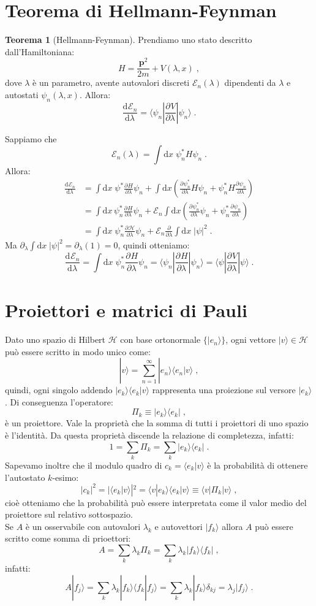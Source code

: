 \documentclass[12pt,a4paper]{report}
\theoremstyle{definition}
\newtheorem{thm}{Teorema}[section]
\newcommand{\pdev}[3][]{\frac{\partial^{#1} #2}{\partial #3^{#1}}}
\newcommand{\dev}[3][]{\frac{\mathrm{d}^{#1} #2}{\mathrm{d} #3^{#1}}}
\newcommand{\ham}{\mathcal{H}}
\numberwithin{equation}{section}
\newcommand{\diff}[1][]{\mathrm{d}#1}
\newcommand{\bra}{\langle}
\newcommand{\ket}{\rangle}
\begin{document}
\section{Teorema di Hellmann-Feynman}
\begin{thm}[Hellmann-Feynman] Prendiamo uno stato descritto dall'Hamiltoniana:
$$
H=\frac{\mathbf{p}^2}{2m}+V(\lambda,x)\;,
$$
dove $\lambda$ è un parametro, avente autovalori discreti $\mathcal{E}_n(\lambda)$ dipendenti da $\lambda$ e autostati $\psi_n(\lambda,x)$. Allora:
$$
\dev{\mathcal{E}_n}{\lambda}=\bra\psi_n|\pdev{V}{\lambda}|\psi_n\ket\;.
$$
\end{thm}
\proof
Sappiamo che
$$
\mathcal{E}_n(\lambda)=\int\diff{x}\;\psi_n^*H\psi_n\;.
$$
Allora:
\begin{align*}
\dev{\mathcal{E}_n}{\lambda}&= \int\diff{x}\;\psi^*\pdev{H}{\lambda}\psi_n+\int\diff{x}\left(\pdev{\psi_n^*}{\lambda}H\psi_n+\psi_n^*H\pdev{\psi_n}{\lambda}\right) \\
&= \int\diff{x}\,\psi_n^*\pdev{H}{\lambda}\psi_n+\mathcal{E}_n\int\diff{x}\left(\pdev{\psi_n^*}{\lambda}\psi_n+
\psi_n^*\pdev{\psi_n}{\lambda}\right) \\
&=\int\diff{x}\;\psi_n^*\pdev{\ham}{\lambda}\psi_n+\mathcal{E}_n\frac{\partial}{\partial\lambda}\int\diff{x}\;
|\psi|^2\;.
\end{align*}
Ma $\partial_{\lambda}\int\diff{x}\;|\psi|^2=\partial_{\lambda}(1)=0$, quindi otteniamo:
$$
\dev{\mathcal{E}_n}{\lambda}=\int\diff{x}\;\psi_n^*\pdev{H}{\lambda}\psi_n=\bra\psi_n|\pdev{H}{\lambda}|\psi_n\ket=\bra\psi|\pdev{V}{\lambda}|\psi\ket\;.
$$
\endproof
\section{Proiettori e matrici di Pauli}
Dato uno spazio di Hilbert $\ham$ con base ortonormale $\{|e_n\ket\}$, ogni vettore $|v\ket\in \ham$ può essere scritto in modo unico come:
$$
|v\ket=\sum_{n=1}^{\infty} |e_n\ket\bra e_n|v\ket\;,
$$
quindi, ogni singolo addendo $|e_k\ket\bra e_k|v\ket$ rappresenta una proiezione sul versore $|e_k\ket$. Di conseguenza l'operatore:
\begin{equation}
\Pi_k\equiv |e_k\ket\bra e_k|\;,
\end{equation}
è un proiettore. Vale la proprietà che la somma di tutti i proiettori di uno spazio è l'identità. Da questa proprietà discende la relazione di completezza, infatti:
$$
1=\sum_k \Pi_k=\sum_k |e_k\ket\bra e_k|\;.
$$
Sapevamo inoltre che il modulo quadro di $c_k=\bra e_k|v\ket$ è la probabilità di ottenere l'autostato $k$-esimo:
\begin{equation}
|c_k|^2=|\bra e_k|v\ket|^2=\bra v|e_k\ket\bra e_k|v\ket\equiv \bra v|\Pi_k|v\ket\;,
\end{equation}
cioè otteniamo che la probabilità può essere interpretata come il valor medio del proiettore sul relativo sottospazio. \\
Se $A$ è un osservabile con autovalori $\lambda_k$ e autovettori $|f_k\ket$ allora $A$ può essere scritto come somma di prioettori:
$$
A=\sum_k \lambda_k\Pi_k=\sum_k \lambda_k|f_k\ket\bra f_k|\;,
$$
infatti:
$$
A|f_j\ket=\sum_k\lambda_k|f_k\ket\bra f_k|f_j\ket=\sum_k \lambda_k|f_k\ket \delta_{kj}=\lambda_j|f_j\ket\;.
$$
\end{document}
